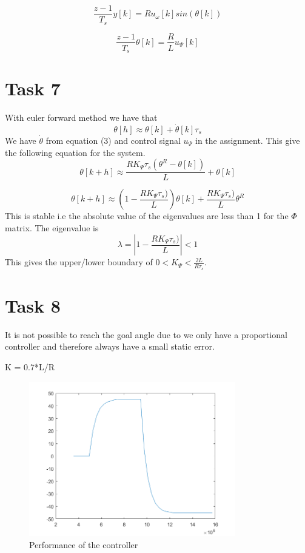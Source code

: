 \documentclass[a4paper,12pt,oneside,onecolumn]{article} %
\begin{document}
\begin{equation}
\frac{z-1}{T_s} y[k] = Ru_\omega[k] sin(\theta[k]) \label{dYdot}
\end{equation}

\begin{equation}
\frac{z-1}{T_s} \theta[k] = \frac{R}{L}u_\Psi[k]\label{dPdot}
\end{equation}


\section*{Task 7}

With euler forward method we have that
\begin{equation*}
\theta[h]\approx \theta[k]+\dot{\theta}[k]\tau_s
\end{equation*}
We have $\dot{\theta}$ from equation (3) and control signal $u_\Psi$ in the assignment. This give the following equation for the system.
\begin{equation*}
\theta[k+h]\approx  \frac{R K_\Psi \tau_s(\theta^R-\theta[k])}{L}+\theta[k]
\end{equation*}

\begin{equation*}
\theta[k+h]\approx  (1-\frac{R K_\Psi \tau_s)}{L})\theta[k]+\frac{R K_\Psi \tau_s)}{L}\theta^R
\end{equation*}
This is stable i.e the absolute value of the eigenvalues are less than 1 for the $\Phi$ matrix. The eigenvalue is
\begin{equation*}
\lambda = |1-\frac{R K_\Psi \tau_s)}{L}|<1
\end{equation*}
This gives the upper/lower boundary of $0<K_\Psi<\frac{2L}{R\tau_s}$. 

\section*{Task 8}

It is not possible to reach the goal angle due to we only have a proportional controller and therefore always have a small static error.

K = 0.7*L/R
\begin{figure}[H]
\begin{center}	
  \includegraphics[width = 0.8\textwidth]{task8.png}
  \caption{Performance of the controller}
  
 \end{center}
\end{figure}
\end{document}
